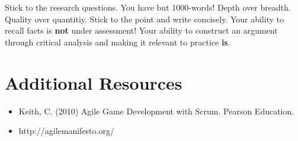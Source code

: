 \documentclass{../fal_assignment}
\begin{document}
Stick to the research questions. You have but 1000-words! Depth over breadth. Quality over quantitiy. Stick to the point and write concisely. Your ability to recall facts is \textbf{not} under assessment! Your ability to construct an argument through critical analysis and making it relevant to practice \textbf{is}.

\section*{Additional Resources}

\begin{itemize}
    \item Keith, C. (2010) Agile Game Development with Scrum. Pearson Education.
    \item http://agilemanifesto.org/
\end{itemize}
\end{document}

